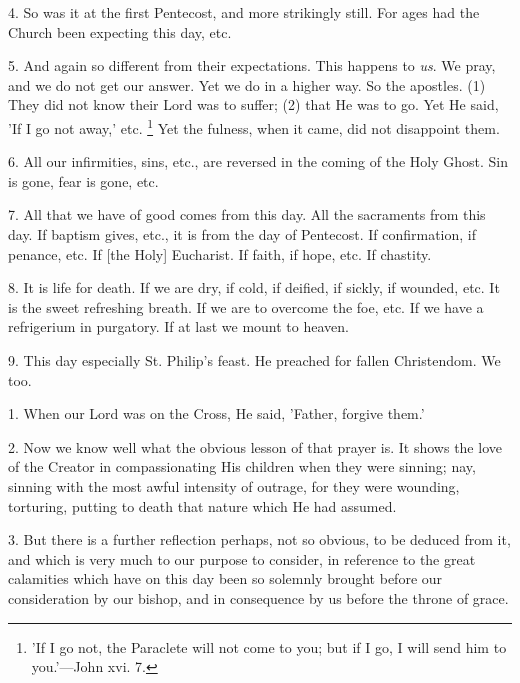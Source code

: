 4. So was it at the first Pentecost, and more
strikingly still. For ages had the Church been expecting this day,
etc.

5. And again so different from their
expectations. This happens to \emph{us}. We pray, and we do not get
our answer. Yet we do in a higher way. So the apostles. (1) They did
not know their Lord was to suffer; (2) that He was to go. Yet He said,
'If I go not away,' etc. \footnote{'If I go not, the
Paraclete will not come to you; but if I go, I will send him to
you.'—John xvi. 7.}
Yet the fulness, when it came, did not disappoint them.

6. All our infirmities, sins, etc., are reversed
in the coming of the Holy Ghost. Sin is gone, fear is gone, etc.

7. All that we have of good comes from this day.
All the sacraments from this day. If baptism gives, etc., it is from
the day of Pentecost. If confirmation, if penance, etc. If [the Holy]
Eucharist. If faith, if hope, etc. If chastity.

8. It is life for death. If we are dry, if cold,
if deified, if sickly, if wounded, etc. It is the sweet refreshing
breath. If we are to overcome the foe, etc. If we have a refrigerium
in purgatory. If at last we mount to heaven.

9. This day especially St. Philip's feast. He
preached for fallen Christendom. We too.


1. When our Lord was on the Cross, He said,
'Father, forgive them.'

2. Now we know well what the obvious lesson of
that prayer is. It shows the love of the Creator in compassionating
His children when they were sinning; nay, sinning with the most awful
intensity of outrage, for they were wounding, torturing, putting to
death that nature which He had assumed.

3. But there is a further reflection perhaps, not
so obvious, to be deduced from it, and which is very much to our
purpose to consider, in reference to the great calamities which have
on this day been so solemnly brought before our consideration by our
bishop, and in consequence by us before the throne of grace.

